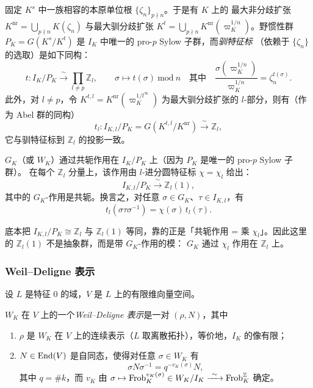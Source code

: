 固定 $K^{s}$ 中一族相容的本原单位根 $\{\zeta_n\}_{p\nmid n}$。于是有 $K$ 上的
最大非分歧扩张 $K^{\mathrm{nr}}=\bigcup_{p\nmid n}K(\zeta_n)$ 与最大驯分歧扩张
$K^{t}=\bigcup_{p\nmid n}K^{\mathrm{nr}}(\varpi_K^{1/n})$。野惯性群
$P_K=G(K^{s}/K^{t})$ 是 $I_K$ 中唯一的 pro-$p$ Sylow 子群，而\emph{驯特征标}
（依赖于 $\{\zeta_n\}$ 的选取）是如下同构：
\[
t\colon I_K/P_K\xrightarrow{\ \sim\ }\prod_{l\neq p}\mathbb{Z}_l,
\qquad
\sigma\longmapsto t(\sigma)\ \mathrm{mod}\ n
\quad\text{其中}\quad
\frac{\sigma(\varpi_K^{1/n})}{\varpi_K^{1/n}}=\zeta_n^{t(\sigma)} .
\]
此外，对 $l\neq p$，令 $K^{t,l}=K^{\mathrm{nr}}(\varpi_K^{1/l^{\infty}})$ 为最大驯分歧扩张的
$l$-部分，则有（作为 Abel 群的同构）
\[
t_l\colon I_{K,l}/P_K=G(K^{t,l}/K^{\mathrm{nr}})\xrightarrow{\ \sim\ }\mathbb{Z}_l ,
\]
它与驯特征标到 $\mathbb{Z}_l$ 的投影一致。

$G_K$（或 $W_K$）通过共轭作用在 $I_K/P_K$ 上（因为 $P_K$ 是唯一的 pro-$p$ Sylow 子群）。
在每个 $\mathbb{Z}_l$ 分量上，该作用由 $l$-进分圆特征标 $\chi=\chi_l$ 给出：
\[
I_{K,l}/P_K\xrightarrow{\ \sim\ }\mathbb{Z}_l(1),
\]
其中的 $G_K$-作用是共轭。换言之，对任意 $\sigma\in G_K$、$\tau\in I_{K,l}$，有
\[
t_l(\sigma\tau\sigma^{-1})=\chi(\sigma)\,t_l(\tau).
\]

\begin{yizhu}
底本把 $I_{K,l}/P_K\cong\mathbb{Z}_l$ 与 $\mathbb{Z}_l(1)$ 等同，靠的正是「共轭作用 =
乘 $\chi_l$」。因此这里的 $\mathbb{Z}_l(1)$ 不是抽象群，而是带 $G_K$-作用的模：
$G_K$ 通过 $\chi_l$ 作用在 $\mathbb{Z}_l$ 上。
\end{yizhu}

\subsubsection{Weil--Deligne 表示}

设 $L$ 是特征 $0$ 的域，$V$ 是 $L$ 上的有限维向量空间。

\begin{definition}
$W_K$ 在 $V$ 上的一个\emph{Weil--Deligne 表示}是一对 $(\rho,N)$，其中
\begin{enumerate}[label=(\arabic*),leftmargin=2.2em]
\item $\rho$ 是 $W_K$ 在 $V$ 上的连续表示（$L$ 取离散拓扑），等价地，$I_K$ 的像有限；
\item $N\in\mathrm{End}(V)$ 是自同态，使得对任意 $\sigma\in W_K$ 有
\[
\sigma N\sigma^{-1}=q^{-v_K(\sigma)}N ,
\]
其中 $q=\#k$，而 $v_K$ 由 $\sigma\mapsto\mathrm{Frob}_K^{v_K(\sigma)}\in W_K/I_K
\xrightarrow{\ \sim\ }\mathrm{Frob}^{\mathbb{Z}}_K$ 确定。
\end{enumerate}
\end{definition}

